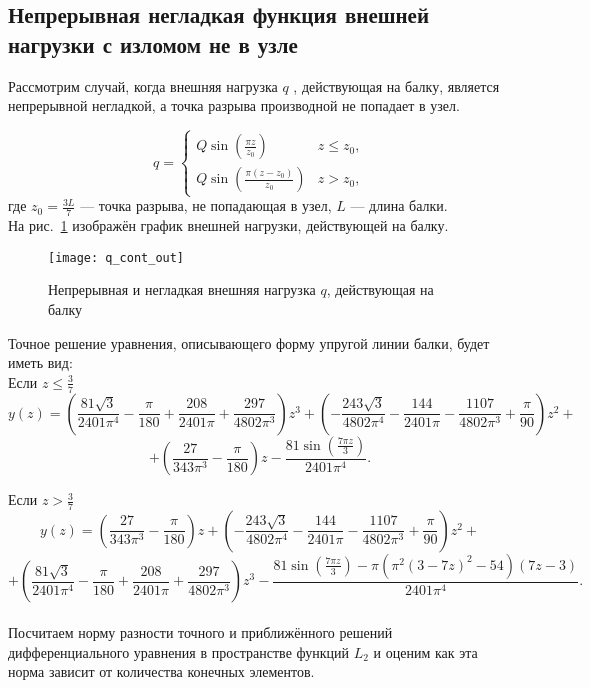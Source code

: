 \documentclass[12pt,a4paper]{article}
\begin{document}
\subsection{Непрерывная негладкая функция внешней нагрузки с \glqq изломом \grqq не в узле}

Рассмотрим случай, когда внешняя нагрузка $q$ , действующая на балку, является непрерывной негладкой, а точка разрыва производной не попадает в узел.
 
\[
q = 
 \begin{cases}
Q \sin \left(\frac{\pi  z}{z_{0}} \right)   &  z \leq z_{0}, \\
Q \sin \left(\frac{\pi  (z-z_{0})}{z_{0}} \right) & z > z_{0},
 \end{cases}
\]
где $z_{0}=\frac{3L}{7}$ --- точка разрыва, не попадающая в узел,  $L$ --- длина балки. \\

На рис.~\ref{fig:q_cont_out} изображён график внешней нагрузки, действующей на балку.
	\begin{figure}[H]
		\centering
		\texttt{[image: q\_cont\_out]}
		\caption{Непрерывная и негладкая внешняя нагрузка $q$, действующая на балку}
		\label{fig:q_cont_out}
	\end{figure}

Точное решение уравнения, описывающего форму упругой линии балки, будет иметь вид:\\

Если $z \leq \frac{3}{7}$ 
$$y(z)= \left(\frac{81 \sqrt{3}}{2401 \pi ^4}-\frac{\pi }{180}+\frac{208}{2401 \pi }+\frac{297}{4802 \pi ^3}\right) z^3+\left(-\frac{243 \sqrt{3}}{4802 \pi ^4}-\frac{144}{2401 \pi }-\frac{1107}{4802 \pi ^3}+\frac{\pi }{90}\right) z^2+$$
$$+\left(\frac{27}{343 \pi ^3}-\frac{\pi }{180}\right) z -\frac{81 \sin \left(\frac{7 \pi  z}{3}\right)}{2401 \pi ^4}.$$

Если $z > \frac{3}{7}$
$$  y(z)= \left(\frac{27}{343 \pi ^3}-\frac{\pi }{180}\right) z+\left(-\frac{243 \sqrt{3}}{4802 \pi ^4}-\frac{144}{2401 \pi }-\frac{1107}{4802 \pi ^3}+\frac{\pi }{90}\right) z^2+$$
$$+\left(\frac{81 \sqrt{3}}{2401 \pi ^4}-\frac{\pi }{180}+\frac{208}{2401 \pi }+\frac{297}{4802 \pi ^3}\right) z^3 - \frac{81 \sin \left(\frac{7 \pi  z}{3}\right)-\pi  \left(\pi ^2 (3-7 z)^2-54\right) (7 z-3)}{2401 \pi ^4}.$$ \\

Посчитаем норму разности точного и приближённого решений дифференциального уравнения в пространстве функций $L_{2}$  и оценим как эта норма зависит от количества конечных элементов.\\
\end{document}
